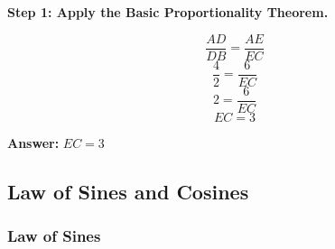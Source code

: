 ﻿\documentclass[12pt]{extarticle}
\begin{document}
\begin{solutionbox}
\textbf{Step 1: Apply the Basic Proportionality Theorem.}

\[\frac{AD}{DB} = \frac{AE}{EC}\]
\[\frac{4}{2} = \frac{6}{EC}\]
\[2 = \frac{6}{EC}\]
\[EC = 3\]

\textbf{Answer:} $\boxed{EC = 3}$
\end{solutionbox}

\subsection{Law of Sines and Cosines}

\subsubsection{Law of Sines}
\end{document}
